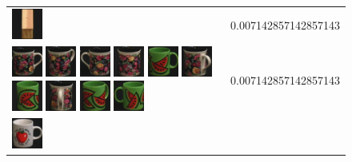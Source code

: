 {\begin{figure}[p]
\begin{tabular}{m{11cm} | m{3cm} |}
\includegraphics[width=1cm]{coil/beeld-47.eps}
& {\scriptsize 0.007142857142857143}
\\
\includegraphics[width=1cm]{coil/beeld-60.eps}
\includegraphics[width=1cm]{coil/beeld-63.eps}
\includegraphics[width=1cm]{coil/beeld-61.eps}
\includegraphics[width=1cm]{coil/beeld-62.eps}
\includegraphics[width=1cm]{coil/beeld-30.eps}
\includegraphics[width=1cm]{coil/beeld-64.eps}
\includegraphics[width=1cm]{coil/beeld-32.eps}
\includegraphics[width=1cm]{coil/beeld-65.eps}
\includegraphics[width=1cm]{coil/beeld-33.eps}
\includegraphics[width=1cm]{coil/beeld-31.eps}
& {\scriptsize 0.007142857142857143}
\\
\includegraphics[width=1cm]{coil/beeld-36.eps}

\end{tabular}
\end{figure}}
